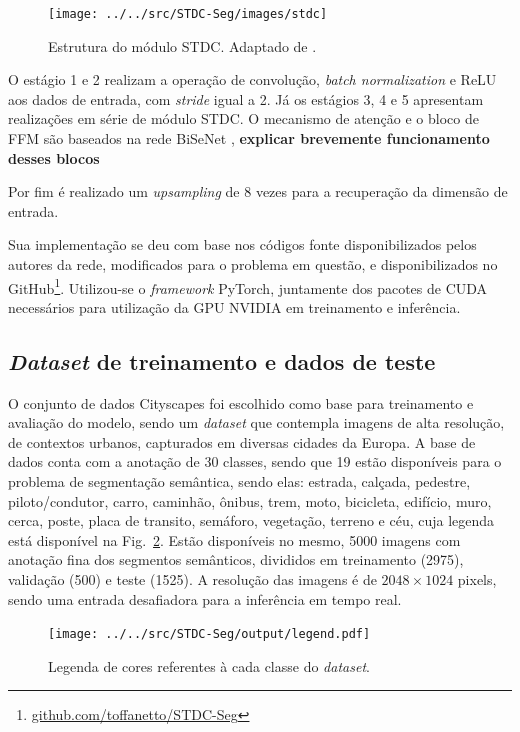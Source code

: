 \documentclass[conference]{IEEEtran}
\begin{document}
\begin{figure}[h!]
	\centering
	\texttt{[image: ../../src/STDC-Seg/images/stdc]}
	\caption{Estrutura do módulo STDC. Adaptado de \cite{fan2021RethinkingBiSeNetRealtime}.}
	\label{fig:stdc}
\end{figure}


O estágio 1 e 2 realizam a operação de convolução, \textit{batch normalization} e ReLU aos dados de entrada, com \textit{stride} igual a 2. Já os estágios 3, 4 e 5 apresentam realizações em série de módulo STDC. O mecanismo de atenção e o bloco de FFM são baseados na rede BiSeNet \cite{yu2018BiSeNetBilateralSegmentation}, \textbf{explicar brevemente funcionamento desses blocos}

Por fim é realizado um \textit{upsampling} de 8 vezes para a recuperação da dimensão de entrada.

Sua implementação se deu com base nos códigos fonte disponibilizados pelos autores da rede, modificados para o problema em questão, e disponibilizados no GitHub\footnote{\href{https://github.com/toffanetto/STDC-Seg}{github.com/toffanetto/STDC-Seg}}. Utilizou-se o \textit{framework} PyTorch, juntamente dos pacotes de CUDA necessários para utilização da GPU NVIDIA em treinamento e inferência.


\subsection{\textit{Dataset} de treinamento e dados de teste}

O conjunto de dados Cityscapes \cite{cordts2016CityscapesDatasetSemantic} foi escolhido como base para treinamento e avaliação do modelo, sendo um \textit{dataset} que contempla imagens de alta resolução, de contextos urbanos, capturados em diversas cidades da Europa. A base de dados conta com a anotação de 30 classes, sendo que 19 estão disponíveis para o problema de segmentação semântica, sendo elas: estrada, calçada, pedestre, piloto/condutor, carro, caminhão, ônibus, trem, moto, bicicleta, edifício, muro, cerca, poste, placa de transito, semáforo, vegetação, terreno e céu, cuja legenda está disponível na Fig.~\ref{fig:legend}. Estão disponíveis no mesmo, 5000 imagens com anotação fina dos segmentos semânticos, divididos em treinamento (2975), validação (500) e teste (1525). A resolução das imagens é de $2048 \times 1024$ pixels, sendo uma entrada desafiadora para a inferência em tempo real.

\begin{figure}[h!]
	\centering
	\texttt{[image: ../../src/STDC-Seg/output/legend.pdf]}
	\caption{Legenda de cores referentes à cada classe do \textit{dataset}.}
	\label{fig:legend}
\end{figure}
\end{document}
